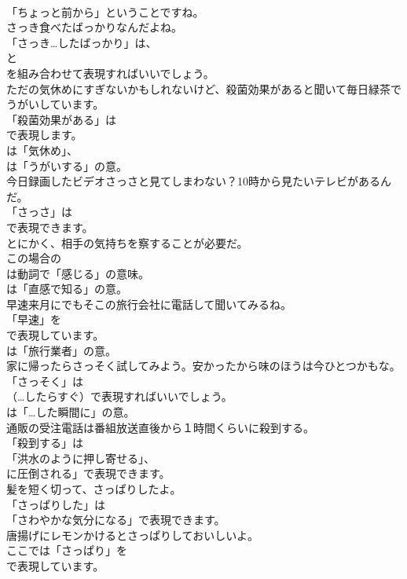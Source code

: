 \documentclass[8pt]{extreport}
\begin{document}
\begin{CJK}{UTF8}{min}
\\	「ちょっと前から」ということですね。	
\\	さっき食べたばっかりなんだよね。 
\\	「さっき…したばっかり」は、
\\	と
\\	を組み合わせて表現すればいいでしょう。	
\\	ただの気休めにすぎないかもしれないけど、殺菌効果があると聞いて毎日緑茶でうがいしています。 
\\	「殺菌効果がある」は
\\	で表現します。
\\	は「気休め」、
\\	は「うがいする」の意。	
\\	今日録画したビデオさっさと見てしまわない？10時から見たいテレビがあるんだ。 
\\	「さっさ」は 
\\	で表現できます。	
\\	とにかく、相手の気持ちを察することが必要だ。 
\\	この場合の 
\\	は動詞で「感じる」の意味。
\\	は「直感で知る」の意。	
\\	早速来月にでもそこの旅行会社に電話して聞いてみるね。 
\\	「早速」を 
\\	で表現しています。
\\	は「旅行業者」の意。	
\\	家に帰ったらさっそく試してみよう。安かったから味のほうは今ひとつかもな。 
\\	「さっそく」は 
\\	（…したらすぐ）で表現すればいいでしょう。
\\	は「…した瞬間に」の意。	
\\	通販の受注電話は番組放送直後から１時間くらいに殺到する。 
\\	「殺到する」は
\\	「洪水のように押し寄せる」、
\\	に圧倒される」で表現できます。	
\\	髪を短く切って、さっぱりしたよ。 
\\	「さっぱりした」は
\\	「さわやかな気分になる」で表現できます。	
\\	唐揚げにレモンかけるとさっぱりしておいしいよ。 
\\	ここでは「さっぱり」を 
\\	で表現しています。	

\end{CJK}
\end{document}
